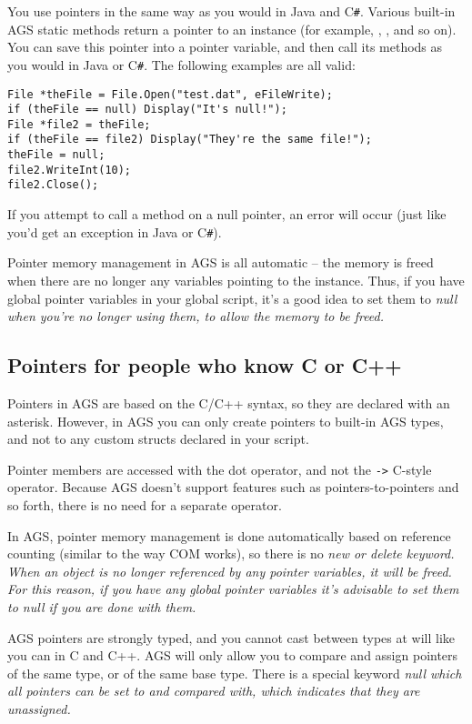 You use pointers in the same way as you would in Java and C\verb$#$. Various built-in AGS static
methods return a pointer to an instance (for example, ,
, and so on). You can save this
pointer into a pointer variable, and then call its methods as you would in Java or C\verb$#$.
The following examples are all valid:
\begin{verbatim}
File *theFile = File.Open("test.dat", eFileWrite);
if (theFile == null) Display("It's null!");
File *file2 = theFile;
if (theFile == file2) Display("They're the same file!");
theFile = null;
file2.WriteInt(10);
file2.Close();
\end{verbatim}
If you attempt to call a method on a null pointer, an error will occur (just like you'd
get an exception in Java or C\verb$#$).

Pointer memory management in AGS is all automatic -- the memory is freed when there are
no longer any variables pointing to the instance. Thus, if you have global pointer variables
in your global script, it's a good idea to set them to \it{null} when you're no longer
using them, to allow the memory to be freed.


\subsection{Pointers for people who know C or C++}\label{PointersForC}%

Pointers in AGS are based on the C/C++ syntax, so they are declared with an asterisk.
However, in AGS you can only create pointers to built-in AGS types, and not to any
custom structs declared in your script.

Pointer members are accessed with the dot operator, and not the \verb$->$ C-style operator.
Because AGS doesn't support features such as pointers-to-pointers and so forth, there
is no need for a separate operator.

In AGS, pointer memory management is done automatically based on reference counting (similar
to the way COM works), so there is no \it{new} or \it{delete} keyword. When an object
is no longer referenced by any pointer variables, it will be freed. For this reason,
if you have any global pointer variables it's advisable to set them to \it{null} if
you are done with them.

AGS pointers are strongly typed, and you cannot cast between types at will like you
can in C and C++. AGS will only allow you to compare and assign pointers of the same
type, or of the same base type. There is a special keyword \it{null} which all pointers
can be set to and compared with, which indicates that they are unassigned.

